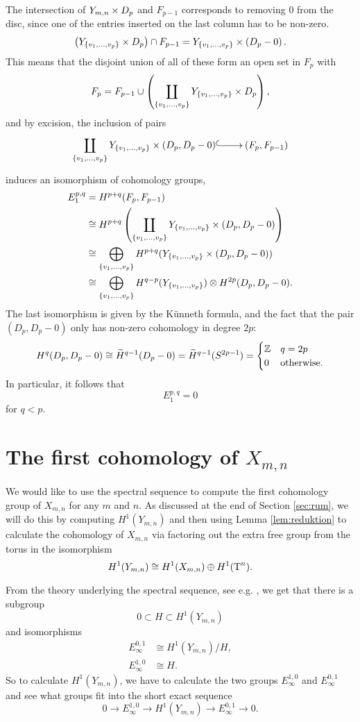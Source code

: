 The intersection of $Y_{m,n}\times D_p$ and $F_{p-1}$ corresponds to
removing 0 from the disc, since one of the entries inserted on the
last column has to be non-zero.
\[ \left(Y_{\left\{ v_1,\dots,v_p \right\}}\times D_p \right) \cap F_{p-1} =
Y_{\left\{ v_1,\dots,v_p \right\}} \times \left(D_p-0\right). \]
This means that the disjoint union of all of these form an open set in
$F_p$ with
\[ F_p = F_{p-1}\cup \left(\coprod_{\left\{ v_1,\dots,v_p \right\}}
  Y_{\left\{ v_1,\dots,v_p \right\}}\times D_p\right), \]
and by excision, the inclusion of pairs
\[ \xymatrix{ \displaystyle \coprod_{\set{v_1,\dots,v_p}}
  Y_{\set{v_1,\dots,v_p}}\times (D_p,D_p-0) \ar@{^(->}[r] &
  (F_p,F_{p-1}) } \]
induces an isomorphism of cohomology groups,
\begin{align*}
  E_1^{p,q} &= H^{p+q}(F_p,F_{p-1}) \\
            &\cong H^{p+q}\left(\coprod_{\left\{ v_1,\dots,v_p \right\}}
              Y_{\left\{ v_1,\dots,v_p \right\}}\times (D_p,D_p-0)\right) \\   
            &\cong \bigoplus_{\left\{ v_1,\dots,v_p \right\}}
              H^{p+q}(Y_{\left\{ v_1,\dots,v_p \right\}}\times (D_p,D_p-0)) \\   
            &\cong \bigoplus_{\left\{ v_1,\dots,v_p \right\}}
              H^{q-p}(Y_{\left\{ v_1,\dots,v_p \right\}})\otimes H^{2p}(D_p,D_p-0).
\end{align*}
The last isomorphism is given by the K\"unneth formula, and the fact
that the pair $(D_p,D_p-0)$ only has non-zero cohomology in degree
$2p$:
\[ H^q(D_p,D_p-0) \cong \widetilde H^{q-1}(D_p-0) = \widetilde
H^{q-1}(S^{2p-1}) =
\begin{cases}
  \mathbb{Z} & q = 2p \\
  0 & \text{otherwise}.
\end{cases} \]
In particular, it follows that
\[ E_1^{p,q} = 0 \]
for $q < p$.

\section{The first cohomology of $X_{m,n}$}
\label{sec:firstcohom}

We would like to use the spectral sequence to compute the first
cohomology group of $X_{m,n}$ for any $m$ and $n$. As discussed at the
end of Section \ref{sec:rum}, we will do this by computing
$H^1(Y_{m,n})$ and
then using Lemma \ref{lem:reduktion} to calculate the cohomology of
$X_{m,n}$ via factoring out the extra free group from the torus
in the isomorphism
\[ H^1(Y_{m,n}) \cong H^1(X_{m,n}) \oplus H^1(\operatorname{T}^n). \]

From the theory
underlying the spectral sequence, see e.g. \cite[Chapter
1]{hatcherss}, we get that there is a subgroup
\[ 0 \subset H \subset H^1(Y_{m,n}) \]
and isomorphisms
\begin{align*}
  E_\infty^{0,1} &\cong H^1(Y_{m,n})/H, \\
  E_\infty^{1,0} &\cong H.
\end{align*}
So to calculate $H^1(Y_{m,n})$, we have to calculate the two groups
$E_\infty^{1,0}$ and $E_\infty^{0,1}$ and see what groups fit
into the short exact sequence
\[ 0 \to E^{1,0}_\infty \to H^1(Y_{m,n}) \to E^{0,1}_\infty \to 0. \]

